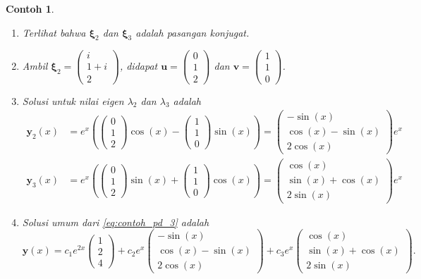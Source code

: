 \documentclass[a4paper]{article}
\theoremstyle{definisi}
\newtheorem{contoh}{Contoh}[subsection]
\newcommand{\bfxi}{\boldsymbol{\xi}}
\numberwithin{equation}{section}
\begin{document}
\begin{contoh}
\begin{enumerate}[label=Langkah \arabic*: ,leftmargin=*]
      \item Terlihat bahwa $\bfxi_2$ dan $\bfxi_3$ adalah pasangan konjugat.
      \item Ambil $\bfxi_2 = \begin{pmatrix}i\\1+i\\2\end{pmatrix}$, didapat $\mathbf{u}= \begin{pmatrix}0\\1\\2\end{pmatrix}$ dan $\mathbf{v} = \begin{pmatrix}1\\1\\0\end{pmatrix}$.
      \item Solusi untuk nilai eigen $\lambda_2$ dan $\lambda_3$ adalah
      \begin{align*}
        \mathbf{y}_2(x) &= e^{x}\left(\begin{pmatrix}0\\1\\2\end{pmatrix}\cos(x) - \begin{pmatrix}1\\1\\0\end{pmatrix}\sin(x)\right)=\begin{pmatrix}-\sin(x)\\\cos(x)-\sin(x)\\2\cos(x)\end{pmatrix}e^x\\
        \mathbf{y}_3(x) &= e^{x}\left(\begin{pmatrix}0\\1\\2\end{pmatrix}\sin(x) + \begin{pmatrix}1\\1\\0\end{pmatrix}\cos(x)\right)=\begin{pmatrix}\cos(x)\\\sin(x)+\cos(x)\\2\sin(x)\end{pmatrix}e^x
      \end{align*}
      \item Solusi umum dari \eqref{eq:contoh_pd_3} adalah
      \[\mathbf{y}(x) = c_1e^{2x}\begin{pmatrix}1\\2\\4\end{pmatrix} + c_2e^x\begin{pmatrix}-\sin(x)\\\cos(x)-\sin(x)\\2\cos(x)\end{pmatrix} + c_3e^x\begin{pmatrix}\cos(x)\\\sin(x)+\cos(x)\\2\sin(x)\end{pmatrix}.\]

\end{enumerate}
\end{contoh}
\end{document}
